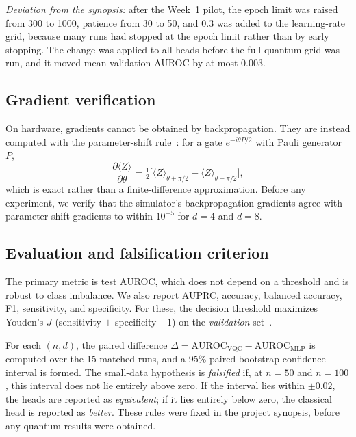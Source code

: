 \documentclass[conference]{IEEEtran}
\begin{document}
\emph{Deviation from the synopsis:} after the Week~1 pilot, the epoch
limit was raised from 300 to 1000, patience from 30 to 50, and 0.3 was
added to the learning-rate grid, because many runs had stopped at the
epoch limit rather than by early stopping. The change was applied to all
heads before the full quantum grid was run, and it moved mean validation
AUROC by at most 0.003.

\subsection{Gradient verification}
On hardware, gradients cannot be obtained by backpropagation. They are
instead computed with the parameter-shift rule~\cite{mitarai2018,schuld2019}:
for a gate $e^{-i\theta P/2}$ with Pauli generator $P$,
\begin{equation}
\frac{\partial\langle Z\rangle}{\partial\theta}=
\tfrac{1}{2}\Big[\langle Z\rangle_{\theta+\pi/2}-\langle Z\rangle_{\theta-\pi/2}\Big],
\end{equation}
which is exact rather than a finite-difference approximation. Before any
experiment, we verify that the simulator's backpropagation gradients agree
with parameter-shift gradients to within $10^{-5}$ for $d=4$ and $d=8$.

\subsection{Evaluation and falsification criterion}
\label{sec:stats}
The primary metric is test AUROC, which does not depend on a threshold and
is robust to class imbalance. We also report AUPRC, accuracy, balanced
accuracy, F1, sensitivity, and specificity. For these, the decision
threshold maximizes Youden's $J$ (sensitivity $+$ specificity $-1$) on the
\emph{validation} set~\cite{youden1950}.

For each $(n,d)$, the paired difference
$\Delta=\mathrm{AUROC}_{\mathrm{VQC}}-\mathrm{AUROC}_{\mathrm{MLP}}$ is
computed over the 15 matched runs, and a 95\% paired-bootstrap confidence
interval is formed. The small-data hypothesis is \emph{falsified} if, at
$n=50$ and $n=100$, this interval does not lie entirely above zero. If the
interval lies within $\pm0.02$, the heads are reported as
\emph{equivalent}; if it lies entirely below zero, the classical head is
reported as \emph{better}. These rules were fixed in the project synopsis,
before any quantum results were obtained.
\end{document}
